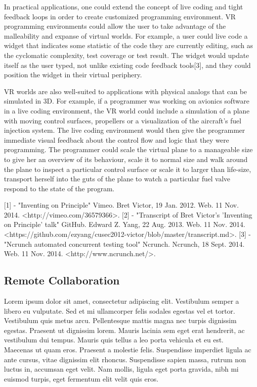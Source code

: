 \documentclass{acm_proc_article-sp}
\begin{document}
In practical applications, one could extend the concept of live coding and tight feedback loops in order to create customized programming environment. VR programming environments could allow the user to take advantage of the malleability and expanse of virtual worlds. For example, a user could live code a widget that indicates some statistic of the code they are currently editing, such as the cyclomatic complexity, test coverage or test result. The widget would update itself as the user typed, not unlike existing code feedback tools[3], and they could position the widget in their virtual periphery.

VR worlds are also well-suited to applications with physical analogs that can be simulated in 3D. For example, if a programmer was working on avionics software in a live coding environment, the VR world could include a simulation of a plane with moving control surfaces, propellers or a visualization of the aircraft's fuel injection system. The live coding environment would then give the programmer immediate visual feedback about the control flow and logic that they were programming. The programmer could scale the virtual plane to a manageable size to give her an overview of its behaviour, scale it to normal size and walk around the plane to inspect a particular control surface or scale it to larger than life-size, transport herself into the guts of the plane to watch a particular fuel valve respond to the state of the program.

[1] - "Inventing on Principle" Vimeo. Bret Victor, 19 Jan. 2012. Web. 11 Nov. 2014. <http://vimeo.com/36579366>.
[2] - "Transcript of Bret Victor's 'Inventing on Principle' talk" GitHub. Edward Z. Yang, 22 Aug. 2013. Web. 11 Nov. 2014. <https://github.com/ezyang/cusec2012-victor/blob/master/transcript.md>.
[3] - "Ncrunch automated concurrent testing tool" Ncrunch. Ncrunch, 18 Sept. 2014. Web. 11 Nov. 2014. <http://www.ncrunch.net/>.

\subsection{Remote Collaboration}

Lorem ipsum dolor sit amet, consectetur adipiscing elit. Vestibulum semper a libero eu vulputate. Sed et mi ullamcorper felis sodales egestas vel et tortor. Vestibulum quis metus arcu. Pellentesque mattis magna nec turpis dignissim egestas. Praesent ut dignissim lorem. Mauris lacinia sem eget erat hendrerit, ac vestibulum dui tempus. Mauris quis tellus a leo porta vehicula et eu est. Maecenas ut quam eros. Praesent a molestie felis. Suspendisse imperdiet ligula ac ante cursus, vitae dignissim elit rhoncus. Suspendisse sapien massa, rutrum non luctus in, accumsan eget velit. Nam mollis, ligula eget porta gravida, nibh mi euismod turpis, eget fermentum elit velit quis eros.
\end{document}
